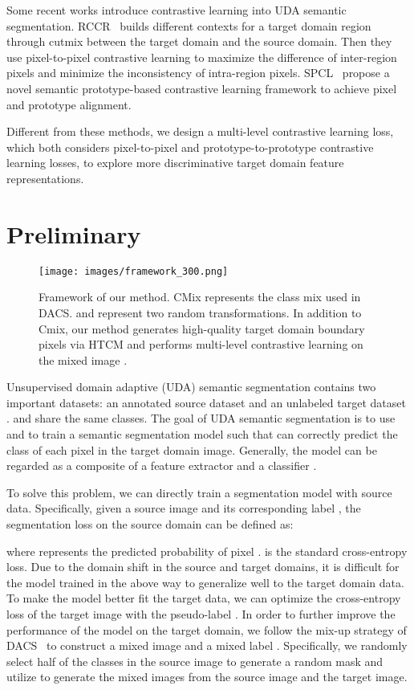 \documentclass[sigconf]{acmart}
\begin{document}
		Some recent works introduce contrastive learning into UDA semantic segmentation.
		RCCR~\cite{zhou2021domain} builds different contexts for a target domain region through cutmix between the target domain and the source domain. Then they use pixel-to-pixel contrastive learning to maximize the difference of inter-region pixels and minimize the inconsistency of intra-region pixels. SPCL~\cite{xie2021spcl} propose a novel semantic prototype-based contrastive learning framework to achieve pixel and prototype alignment. 
		
		Different from these methods, 
		we design a multi-level contrastive learning loss, which both considers pixel-to-pixel and prototype-to-prototype contrastive learning losses, to explore more discriminative target domain feature representations. 

		
		
		
		
		\section{Preliminary}
		\begin{figure*}
			\centering
			\texttt{[image: images/framework\_300.png]}
			\caption{Framework of our method. CMix represents the class mix used in DACS.  and  represent two random transformations. In addition to Cmix, our method generates high-quality target domain boundary pixels via HTCM and performs multi-level contrastive learning on the mixed image .}
			\label{figure:Framework}
			\vspace{-10pt}
		\end{figure*}
		Unsupervised domain adaptive (UDA) semantic segmentation contains two important datasets: an annotated source dataset  and an unlabeled target dataset .  and  share the same  classes. The goal of UDA semantic segmentation is to use  and  to train a semantic segmentation model  such that  can correctly predict the class of each pixel in the target domain image. Generally, the model  can be regarded as a composite of a feature extractor  and a classifier . 
		
		To solve this problem, we can directly train a segmentation model with source data. Specifically, given a source image  and its corresponding label , the segmentation loss on the source domain can be defined as:
		
		where  represents the predicted probability of pixel .  is the standard cross-entropy loss. Due to the domain shift in the source and target domains, it is difficult for the model trained in the above way to generalize well to the target domain data.
		To make the model better fit the target data, we can optimize the cross-entropy loss of the target image  with the pseudo-label . 
		In order to further improve the performance of the model on the target domain, we follow the mix-up strategy of DACS~\cite{tranheden2021dacs} to construct a mixed image  and a mixed label . Specifically, we randomly select half of the classes in the source image to generate a random mask  and utilize  to generate the mixed images from the source image and the target image.
		
\end{document}
